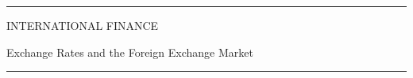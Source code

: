 \documentclass[12pt,aspectratio=169]{beamer}
\begin{document}
\begin{frame}

\begin{center}

\rule{\textwidth}{2pt}

\vskip3mm
INTERNATIONAL FINANCE

Exchange Rates and the Foreign Exchange Market
\rule{\textwidth}{2pt}

\end{center}

\end{frame}


\end{document}
